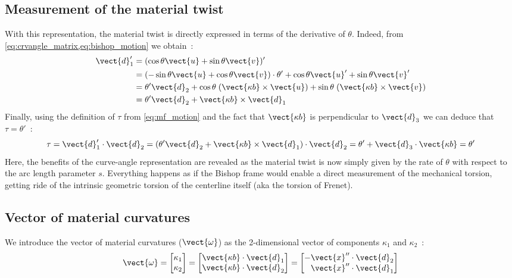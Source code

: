 \subsection{Measurement of the material twist}
With this  representation, the material twist is directly expressed in terms of the derivative of $\theta$. Indeed, from \cref{eq:crvangle_matrix,eq:bishop_motion} we obtain~:
\begin{equation}
	\begin{aligned}
		\vect{d}'_1
			&= (\cos{\theta} \vect{u} + \sin{\theta}\vect{v})' \\
			& = (-\sin{\theta} \vect{u} + \cos{\theta}\vect{v})\cdot \theta' +  \cos{\theta} \vect{u}' + \sin{\theta}\vect{v}' \\
			& = \theta' \vect{d}_2 + \cos{\theta}\; (\vect{\kappa b} \times \vect{u}) + \sin{\theta}\; (\vect{\kappa b} \times \vect{v})\\
			& = \theta' \vect{d}_2 + \vect{\kappa b} \times \vect{d}_1\\
	\end{aligned}
\end{equation}
Finally, using the definition of $\tau$ from \cref{eq:mf_motion} and the fact that $\vect{\kappa b}$ is perpendicular to $\vect{d}_3$ we can deduce that $\tau=\theta'$~:
\begin{equation}
	\tau = \vect{d}'_1 \cdot \vect{d}_2 = (\theta'\vect{d}_2 + \vect{\kappa b}\times\vect{d}_1)\cdot \vect{d}_2 = \theta' + \vect{d}_3\cdot\vect{\kappa b} = \theta'
\label{eq:thetatau}
\end{equation}
Here, the benefits of the curve-angle representation are revealed as the material twist is now simply given by the rate of $\theta$ with respect to the arc length parameter $s$. Everything happens as if the Bishop frame would enable a direct measurement of the mechanical torsion, getting ride of the intrinsic geometric torsion of the centerline itself (aka the torsion of Frenet).
\subsection{Vector of material curvatures}
We introduce the vector of material curvatures ($\vect{\omega}$) as the 2-dimensional vector of components $\kappa_1$ and $\kappa_2$~:
\begin{equation}
	\vect{\omega} =
	\begin{bmatrix*}[r]
		\kappa_1\\
		\kappa_2\\
	\end{bmatrix*} =
	\begin{bmatrix}
		\vect{\kappa b}\cdot\vect{d}_1\\
		\vect{\kappa b}\cdot\vect{d}_2\\
	\end{bmatrix} =
	\begin{bmatrix*}[r]
		-\vect{x}''\cdot\vect{d}_2\\
		\vect{x}''\cdot\vect{d}_1\\
	\end{bmatrix*}
\end{equation}


